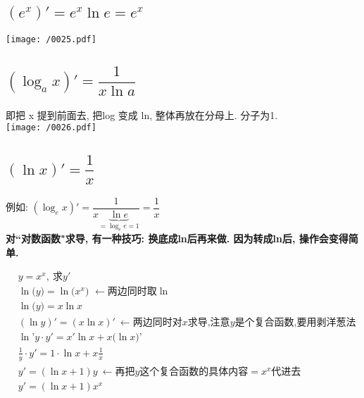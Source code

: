 \documentclass[UTF8]{ctexart}
\begin{document}
\subsection{$(e^x)' = e^x \ln e = e^x$}

\texttt{[image: /0025.pdf]}




\subsection{$(\log_a x)' = \dfrac{1} {x \ln a}$}

即把 x 提到前面去, 把log 变成 ln, 整体再放在分母上. 分子为1. \\

\texttt{[image: /0026.pdf]}



\subsection{$(\ln x)' = \dfrac{1} {x}$}

例如: 
$\left( \log _ex \right) '=\dfrac{1}{x\underset{=\log _ee=1}{\underbrace{\ln e}}}=\dfrac{1}{x}$ \\


\textbf{对``对数函数"求导, 有一种技巧: 换底成ln后再来做. 因为转成ln后, 操作会变得简单.} \\

\begin{myEnvSample}
	\begin{align*}
	&y=x^x,\ \text{求}y'\\
&\ln\text{(}y\text{)}=\ln\text{(}x^x\text{)\ }\gets \text{两边同时取}\ln\\
&\ln\text{(}y\text{)}=x\ln x\\
&\left( \ln y \right) '=\left( x\ln x \right) '\ \gets \text{两边同时对}x\text{求导,注意}y\text{是个复合函数,要用剥洋葱法}\\
&\ln\text{'}y\cdot y'=x'\ln x+x\text{(}\ln x\text{)'}\\
&\frac{1}{y}\cdot y'=1\cdot \ln x+x\frac{1}{x}\\
&y'=\left( \ln x+1 \right) y\ \gets \text{再把}y\text{这个复合函数的具体内容}=x^x\text{代进去}\\
&y'=\left( \ln x+1 \right) x^x
	\end{align*}
\end{myEnvSample}
\end{document}
